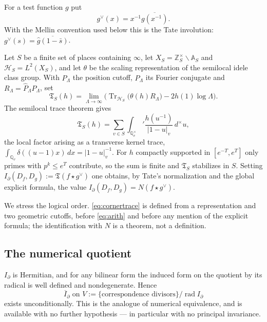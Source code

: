 \documentclass[11pt]{amsart}
\theoremstyle{definition}
\theoremstyle{remark}
\newcommand{\Z}{\mathbb Z}
\newcommand{\Q}{\mathbb Q}
\newcommand{\A}{\mathbb A}
\newcommand{\Tr}{\operatorname{Tr}}
\begin{document}
For a test function $g$ put
\begin{equation}\label{eq:Tateinvolution}
 g^\vee(x)=x^{-1}\overline{g(x^{-1})}.
\end{equation}
With the Mellin convention used below this is the Tate involution:
$\widehat{g^\vee}(s)=\overline{\widehat g(1-\bar s)}$.

Let $S$ be a finite set of places containing $\infty$, let
$X_S=\Z_S^\times\backslash\A_S$ and $\mathcal H_S=L^2(X_S)$, and let $\theta$
be the scaling representation of the semilocal idele class group.  With
$P_\Lambda$ the position cutoff, $\widehat P_\Lambda$ its Fourier conjugate
and $R_\Lambda=\widehat P_\Lambda P_\Lambda$, set
\begin{equation}\label{eq:cornertrace}
 \mathfrak T_S(h)=\lim_{\Lambda\to\infty}
 \Big(\Tr_{\mathcal H_S}\big(\theta(h)R_\Lambda\big)-2h(1)\log\Lambda\Big).
\end{equation}
The semilocal trace theorem \cite{Connes1999,CCJacobian} gives
\begin{equation}\label{eq:arith}
 \mathfrak T_S(h)=\sum_{v\in S}\int_{\Q_v^\times}'
 \frac{h(u^{-1})}{|1-u|_v}\,d^\times u,
\end{equation}
the local factor arising as a transverse kernel trace,
$\int_{\Q_v}\delta((u-1)x)\,dx=|1-u|_v^{-1}$.  For $h$ compactly supported
in $[e^{-T},e^{T}]$ only primes with $p^k\le e^T$ contribute, so the sum is
finite and $\mathfrak T_S$ stabilizes in $S$.  Setting
$I_\partial(D_f,D_g):=\mathfrak T(f\star g^\vee)$ one obtains, by Tate's
normalization and the global explicit formula, the value
$I_\partial(D_f,D_g)=N(f\star g^\vee)$.

We stress the logical order.  \eqref{eq:cornertrace} is defined from a
representation and two geometric cutoffs, before \eqref{eq:arith} and before
any mention of the explicit formula; the identification with $N$ is a
theorem, not a definition.

\subsection{The numerical quotient}

$I_\partial$ is Hermitian, and for any bilinear form the induced form on the
quotient by its radical is well defined and nondegenerate.  Hence
\begin{equation}
 \overline I_\partial \text{ on } V:=\{\text{correspondence divisors}\}/
 \operatorname{rad}I_\partial
\end{equation}
exists unconditionally.  This is the analogue of numerical equivalence, and
is available with no further hypothesis --- in particular with no principal
invariance.
\end{document}
